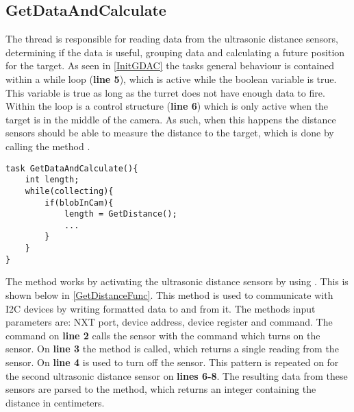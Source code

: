 \subsection{GetDataAndCalculate}\label{GetDataAndCalc}
The thread  is responsible for reading data
from the ultrasonic distance sensors, determining if the data is useful,
grouping data and calculating a future position for the target. As seen in
\autoref{InitGDAC} the tasks general behaviour is contained within a while loop
(\textbf{line 5}), which is active while the boolean variable
 is true. This variable is true as long as the
turret does not have enough data to fire. Within the loop is a control structure
(\textbf{line 6}) which is only active when the target is in the middle of the
camera. As such, when this happens the distance sensors should be able to
measure the distance to the target, which is done by calling the method
.\nl

\begin{minipage}[H]{\linewidth}
\begin{lstlisting}[caption = General behaviour for GetDataAndCalculate, label = InitGDAC] 
task GetDataAndCalculate(){
    int length;
    while(collecting){
        if(blobInCam){
            length = GetDistance();
            ...
        }
    }
}
\end{lstlisting}
\end{minipage}

The  method works by activating the ultrasonic distance
sensors by using . This is shown below in
\autoref{GetDistanceFunc}. This method is used to communicate with I2C devices
by writing formatted data to and from it. The methods input parameters are: NXT
port, device address, device register and command. The command on \textbf{line
2} calls the sensor with the command  which turns on
the sensor. On \textbf{line 3} the  method is called, which
returns a single reading from the sensor. On \textbf{line 4}
 is used to turn off the sensor. This pattern is repeated on
for the second ultrasonic distance sensor on \textbf{lines 6-8}. The resulting
data from these sensors are parsed to the  method, which
returns an integer containing the distance in centimeters.\nl

